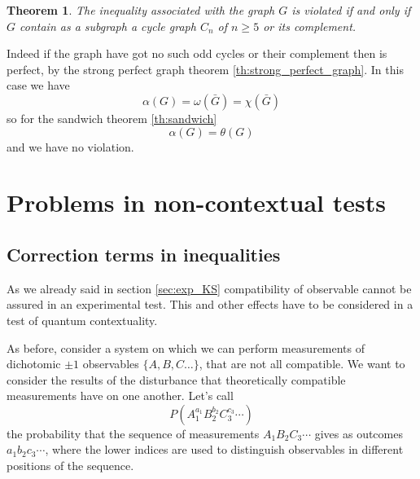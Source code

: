\documentclass[a4paper]{article}
\newtheorem{theorem}{Theorem}[section]
\theoremstyle{definition}
\let\oldproof\proof
\let\oldendproof\endproof
\renewenvironment{proof}
    {
        \begin{framed} 
        \oldproof
    }
    {
        \oldendproof 
        \end{framed}
    }
\begin{document}
\begin{theorem}
    The inequality associated with the graph $G$ is violated if and only if $G$
    contain as a subgraph a cycle graph $C_n$ of $n\ge5$ or its complement.
    \label{th:nc_graph_indinum}
\end{theorem}
\begin{proof}
    Indeed if the graph have got no such odd cycles or their complement then is
    perfect, by the strong perfect graph theorem \ref{th:strong_perfect_graph}.
    In this case we have
    \begin{equation}
        \alpha(G) = \omega(\bar G) = \chi(\bar G)
    \end{equation}
    so for the sandwich theorem \ref{th:sandwich}
    \begin{equation}
        \alpha(G) = \theta(G)
    \end{equation}
    and we have no violation.
\end{proof}

\section{Problems in non-contextual tests}
\label{sec:nc_tests} 

\subsection{Correction terms in inequalities}
As we already said in section \ref{sec:exp_KS} compatibility of observable
cannot be assured in an experimental test.
This and other effects have to be considered in a test of quantum contextuality.

As before, consider a system on which we can perform measurements
of dichotomic $\pm1$ observables $\{A,B,C\ldots\}$, that are not all compatible.
We want to consider the results of the disturbance that theoretically
compatible measurements have on one another.
Let's call
\begin{equation}
    P\left(A_1^{a_1} B_2^{b_2} C_3^{c_3}\cdots\right)
\end{equation}
the probability that the sequence of measurements $A_1 B_2 C_3 \cdots$ 
gives as outcomes $a_1 b_2 c_3\cdots $, where the lower indices are used to
distinguish observables in different positions of the sequence.
\end{document}

